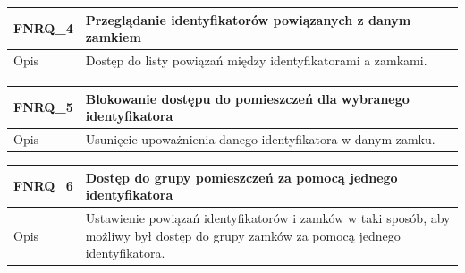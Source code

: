 \begin{table}[h!]
        \quad%
            \begin{subtable}[c]{\textwidth}
                \centering
                 \begin{tabular}{|p{2cm}|p{12cm}|}
                    \hline FNRQ\_4      & \textbf{Przeglądanie identyfikatorów powiązanych z danym zamkiem} \\
                    \hline \cellcolor[gray]{0.8} Opis         & Dostęp do listy powiązań między identyfikatorami a zamkami. \\
                    \hline
                \end{tabular}
                \label{tbl:fnrq4}
                \vspace{10mm}           
            \end{subtable}
        \quad%
            \begin{subtable}[c]{\textwidth}
                \centering
                 \begin{tabular}{|p{2cm}|p{12cm}|}
                    \hline FNRQ\_5      & \textbf{Blokowanie dostępu do pomieszczeń dla wybranego identyfikatora}  \\
                    \hline \cellcolor[gray]{0.8} Opis         & Usunięcie upoważnienia danego identyfikatora w danym zamku. \\
                    \hline
                \end{tabular}
                \label{tbl:fnrq5}
                \vspace{10mm}           
            \end{subtable}
        \quad%
            \begin{subtable}[c]{\textwidth}
                \centering
                 \begin{tabular}{|p{2cm}|p{12cm}|}
                    \hline FNRQ\_6      & \textbf{Dostęp do grupy pomieszczeń za pomocą jednego identyfikatora}  \\
                    \hline \cellcolor[gray]{0.8} Opis         & Ustawienie powiązań identyfikatorów i zamków w taki sposób, aby możliwy był dostęp do grupy zamków za pomocą jednego identyfikatora. \\
                    \hline
                \end{tabular}
                \label{tbl:fnrq6}
                \vspace{10mm}           
            \end{subtable}
        \quad%
            \begin{subtable}[c]{\textwidth}

\end{subtable}
\end{table}
